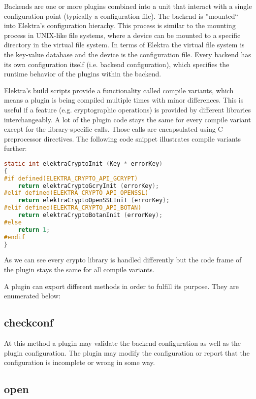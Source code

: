 Backends are one or more plugins combined into a unit that interact with a single configuration point (typically a configuration file).
The backend is ''mounted`` into Elektra's configuration hierachy.
This process is similar to the mounting process in UNIX-like file systems, where a device can be mounted to a specific directory in the virtual file system.
In terms of Elektra the virtual file system is the key-value database and the device is the configuration file.
Every backend has its own configuration itself (i.e. backend configuration), which specifies the runtime behavior of the plugins within the backend.

Elektra's build scripts provide a functionality called compile variants, which means a plugin is being compiled multiple times with minor differences.
This is useful if a feature (e.g. cryptographic operations) is provided by different libraries interchangeably.
A lot of the plugin code stays the same for every compile variant except for the library-specific calls.
Those calls are encapsulated using C preprocessor directives.
The following code snippet illustrates compile variants further:

\begin{lstlisting}[language=C]
static int elektraCryptoInit (Key * errorKey)
{
#if defined(ELEKTRA_CRYPTO_API_GCRYPT)
	return elektraCryptoGcryInit (errorKey);
#elif defined(ELEKTRA_CRYPTO_API_OPENSSL)
	return elektraCryptoOpenSSLInit (errorKey);
#elif defined(ELEKTRA_CRYPTO_API_BOTAN)
	return elektraCryptoBotanInit (errorKey);
#else
	return 1;
#endif
}
\end{lstlisting}

As we can see every crypto library is handled differently but the code frame of the plugin stays the same for all compile variants.

A plugin can export different methods in order to fulfill its purpose.
They are enumerated below:

\subsection{checkconf}\label{checkconf}

At this method a plugin may validate the backend configuration as well as
the plugin configuration. The plugin may modify the configuration or
report that the configuration is incomplete or wrong in some way.

\subsection{open}\label{open}

